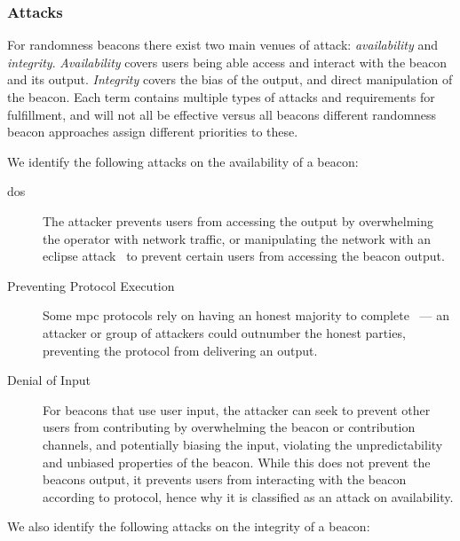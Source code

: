 \subsubsection{Attacks}\label{ssub:security_objectives}
For randomness beacons there exist two main venues of attack: \emph{availability} and \emph{integrity}. \emph{Availability} covers users being able access and interact with the beacon and its output. \emph{Integrity} covers the bias of the output, and direct manipulation of the beacon.
Each term contains multiple types of attacks and requirements for fulfillment, and will not all be effective versus all beacons different randomness beacon approaches assign different priorities to these.

We identify the following attacks on the availability of a beacon:

\begin{description}
    \item[\Acrfull{dos}] The attacker prevents users from accessing the output by overwhelming the operator with network traffic, or manipulating the network with an eclipse attack~\cite{Singh06eclipseattacks} to prevent certain users from accessing the beacon output.
    \item[Preventing Protocol Execution] Some \gls{mpc} protocols rely on having an honest majority to complete~\cite{cascudo2017scrape} --- an attacker or group of attackers could outnumber the honest parties, preventing the protocol from delivering an output.
    \item[Denial of Input] For beacons that use user input, the attacker can seek to prevent other users from contributing by overwhelming the beacon or contribution channels, and potentially biasing the input, violating the unpredictability and unbiased properties of the beacon.
        While this does not prevent the beacons output, it prevents users from interacting with the beacon according to protocol, hence why it is classified as an attack on availability.
\end{description}

\noindent%
We also identify the following attacks on the integrity of a beacon:

